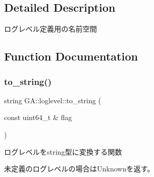 \subsection{Detailed Description}
ログレベル定義用の名前空間 



\subsection{Function Documentation}
\mbox{\label{namespace_g_a_1_1loglevel_a9319a21550f7dfdd3229358e00009ce4}} 
\subsubsection{\texorpdfstring{to\_string()}{to\_string()}}
{\footnotesize\ttfamily string G\+A\+::loglevel\+::to\+\_\+string (\begin{DoxyParamCaption}\item[{const uint64\+\_\+t \&}]{flag }\end{DoxyParamCaption})}



ログレベルをstring型に変換する関数 

未定義のログレベルの場合は\+Unknownを返す。 